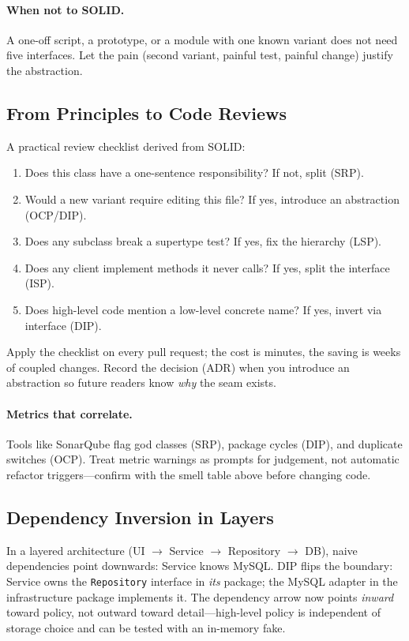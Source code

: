 \paragraph{When not to SOLID.} A one-off script, a prototype, or a module with one known variant does not need five interfaces. Let the pain (second variant, painful test, painful change) justify the abstraction.

\subsection{From Principles to Code Reviews}
A practical review checklist derived from SOLID:
\begin{enumerate}[itemsep=0.2em]
    \item Does this class have a one-sentence responsibility? If not, split (SRP).
    \item Would a new variant require editing this file? If yes, introduce an abstraction (OCP/DIP).
    \item Does any subclass break a supertype test? If yes, fix the hierarchy (LSP).
    \item Does any client implement methods it never calls? If yes, split the interface (ISP).
    \item Does high-level code mention a low-level concrete name? If yes, invert via interface (DIP).
\end{enumerate}
Apply the checklist on every pull request; the cost is minutes, the saving is weeks of coupled changes. Record the decision (ADR) when you introduce an abstraction so future readers know \emph{why} the seam exists.

\paragraph{Metrics that correlate.} Tools like SonarQube flag god classes (SRP), package cycles (DIP), and duplicate switches (OCP). Treat metric warnings as prompts for judgement, not automatic refactor triggers---confirm with the smell table above before changing code.

\subsection{Dependency Inversion in Layers}
In a layered architecture (UI $\to$ Service $\to$ Repository $\to$ DB), naive dependencies point downwards: Service knows MySQL. DIP flips the boundary: Service owns the \texttt{Repository} interface in \emph{its} package; the MySQL adapter in the infrastructure package implements it. The dependency arrow now points \emph{inward} toward policy, not outward toward detail---high-level policy is independent of storage choice and can be tested with an in-memory fake.

